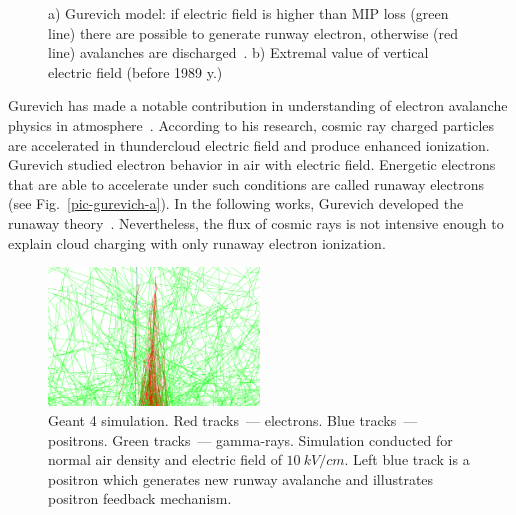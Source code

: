\documentclass[utf8]{webofc}
\begin{document}
\begin{figure}[ht!]
\begin{subfigure}[b]{0.5\textwidth}
            \caption{}
            \label{pic-field-b}
        \end{subfigure}
        \caption{
            a) Gurevich model: if electric field is higher than MIP loss (green line) there are possible to generate runway electron, otherwise (red line) avalanches are  discharged~\cite{gurevich1992runaway}.
            b) Extremal value of vertical electric field (before 1989 y.)~\cite{mazin1989clouds}}
    \end{figure}
    
    Gurevich has made a notable contribution in understanding of electron avalanche physics in atmosphere~\cite{gurevich1992runaway}. According to his research, cosmic ray charged particles are accelerated in thundercloud electric field and produce enhanced ionization. Gurevich studied electron behavior in air with electric field. Energetic electrons that are able to accelerate under such conditions are called runaway electrons (see Fig.~\ref{pic-gurevich-a}). In the following works, Gurevich developed the runaway theory~\cite{gurevich1999lightning,gurevich2001kinetic}. Nevertheless, the flux of cosmic rays is not intensive enough to explain cloud charging with only runaway electron ionization.
    \begin{figure}[t]
        \centering
        \includegraphics[width=0.5\textwidth]{pictures/10_dwyer}
        
        
        
        \caption{Geant 4 simulation. Red tracks~--- electrons. Blue tracks~--- positrons. Green tracks~--- gamma-rays. Simulation conducted for normal air density and electric field of $10~kV/cm$. Left blue track is a positron which generates new runway avalanche and illustrates positron feedback mechanism.}
        \label{pic-dwyer-a}   
    \end{figure}
    
\end{document}
